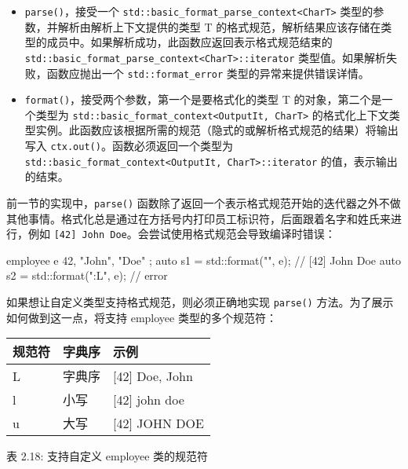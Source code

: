 \begin{itemize}
\item
\verb|parse()|，接受一个 \verb|std::basic_format_parse_context<CharT>| 类型的参数，并解析由解析上下文提供的类型 T 的格式规范，解析结果应该存储在类型的成员中。如果解析成功，此函数应返回表示格式规范结束的 \verb|std::basic_format_parse_context<CharT>::iterator| 类型值。如果解析失败，函数应抛出一个 \verb|std::format_error| 类型的异常来提供错误详情。

\item
\verb|format()|，接受两个参数，第一个是要格式化的类型 T 的对象，第二个是一个类型为 \verb|std::basic_format_context<OutputIt, CharT>| 的格式化上下文类型实例。此函数应该根据所需的规范（隐式的或解析格式规范的结果）将输出写入 \verb|ctx.out()|。函数必须返回一个类型为 \verb|std::basic_format_context<OutputIt, CharT>::iterator| 的值，表示输出的结束。
\end{itemize}

前一节的实现中，\verb|parse()| 函数除了返回一个表示格式规范开始的迭代器之外不做其他事情。格式化总是通过在方括号内打印员工标识符，后面跟着名字和姓氏来进行，例如 \verb|[42] John Doe|。会尝试使用格式规范会导致编译时错误：

\begin{cpp}
employee e{ 42, "John", "Doe" };
auto s1 = std::format("{}", e);   // [42] John Doe
auto s2 = std::format("{:L}", e); // error
\end{cpp}

如果想让自定义类型支持格式规范，则必须正确地实现 \verb|parse()| 方法。为了展示如何做到这一点，将支持 employee 类型的多个规范符：

\begin{longtable}{|l|l|l|}
\hline
\textbf{规范符} & \textbf{字典序} & \textbf{示例}   \\ \hline
\endfirsthead
%
\endhead
%
L                  & 字典序  & {[}42{]} Doe, John \\ \hline
l                  & 小写            & {[}42{]} john doe  \\ \hline
u                  & 大写            & {[}42{]} JOHN DOE  \\ \hline
\end{longtable}

\begin{center}
表 2.18: 支持自定义 employee 类的规范符
\end{center}

